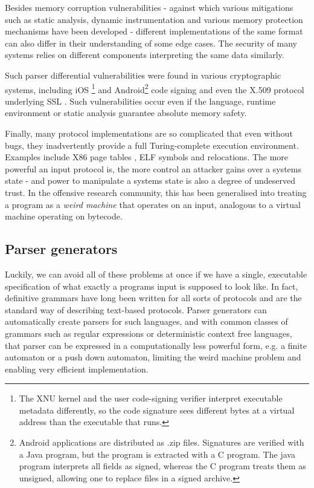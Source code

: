 \documentclass{article}
\begin{document}
Besides memory corruption vulnerabilities - against which various mitigations such as static
analysis, dynamic instrumentation and various memory protection mechanisms have been developed -
different implementations of the same format can also differ in their understanding of some edge
cases. The security of many systems relies on different components interpreting the same data
similarly.

Such parser differential vulnerabilities were found in various cryptographic systems, including  iOS
\footnote{The XNU kernel and the user code-signing verifier interpret executable metadata
  differently, so the code signature sees different bytes at a virtual address than the executable
  that runs.}\cite{evaders6} and Android\footnote{Android applications are distributed as .zip
  files. Signatures are verified with a Java program, but the program is extracted with a C program.
The java program interprets all fields as signed, whereas the C program treats them as unsigned,
allowing one to replace files in a signed archive.}
\cite{saurik-masterkey} code signing and even the
X.509 protocol underlying SSL \cite{pki-layer}. Such vulnerabilities occur even if the language,
runtime environment or static analysis guarantee absolute memory safety.

Finally, many protocol implementations are so complicated that even without bugs, they inadvertently
provide a full Turing-complete execution environment. Examples include X86 page tables
\cite{bangert-woot}, ELF symbols and relocations\cite{shapiro-woot}.  
The more powerful an input
protocol is, the more control an attacker gains over a systems state - and power to manipulate a
systems state is also a degree of undeserved trust. In the offensive research community, this has
been generalised into treating a program as a \textit{weird machine}\cite{Bratus-langsec} that
operates on an input, analogous to a virtual machine operating on bytecode.

\subsection{Parser generators}
Luckily, we can avoid all of these problems at once if we have a single, executable specification of
what exactly a programs input is supposed to look like. In fact, definitive grammars have long
been written for all sorts of protocols and are the standard way of describing text-based protocols.
Parser generators can automatically create parsers for such languages, and with common classes of
grammars such as regular expressions or deterministic context free languages, that parser can be
expressed in a computationally less powerful form, e.g. a finite automaton or a push down automaton,
limiting the weird machine problem and enabling very efficient implementation.
\end{document}
